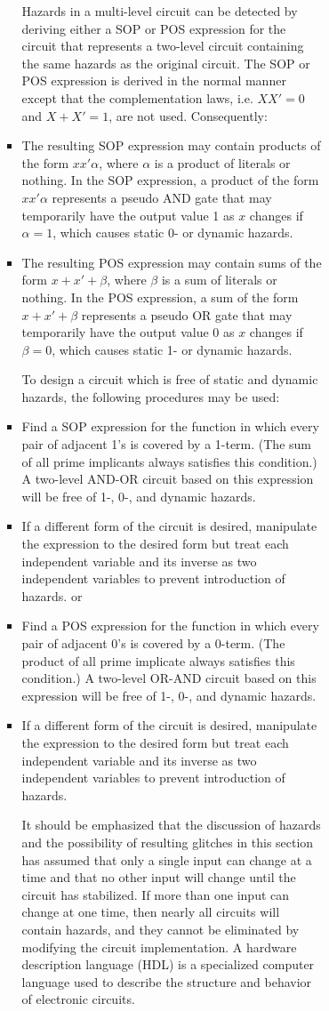 \documentclass[a4paper,12pt]{article}
\begin{document}
\begin{itemize}
\begin{itemize}
\begin{itemize}
\begin{itemize}
\begin{itemize}
\begin{itemize}
\begin{itemize}
Hazards in a multi-level circuit can be detected by deriving either a SOP or POS expression for the circuit that represents a two-level circuit containing the same hazards as the original circuit. The SOP or POS expression is derived in the normal manner except that the complementation laws, i.e. $XX'=0$ and $X+X'=1$, are not used. Consequently:
\bit
\item The resulting SOP expression may contain products of the form $xx'\alpha$, where $\alpha$ is a product of literals or nothing. In the SOP expression, a product of the form $xx'\alpha$ represents a pseudo AND gate that may temporarily have the output value 1 as $x$ changes if $\alpha=1$, which causes static 0- or dynamic hazards.
\item The resulting POS expression may contain sums of the form $x+x'+\beta$, where $\beta$ is a sum of literals or nothing. In the POS expression, a sum of the form $x+x'+\beta$ represents a pseudo OR gate that may temporarily have the output value 0 as $x$ changes if $\beta=0$, which causes static 1- or dynamic hazards.
\eit

To design a circuit  which is free of static and dynamic hazards, the following procedures may be used:
\ben
\item Find a SOP expression for the function in which every pair of adjacent 1's is covered by a 1-term. (The sum of all prime implicants always satisfies this condition.) A two-level AND-OR circuit based on this expression will be free of 1-, 0-, and dynamic hazards.
\item If a different form of the circuit is desired, manipulate the expression to the desired form but treat each independent variable and its inverse as two independent variables to prevent introduction of hazards.
\een
or
\ben
\item Find a POS expression for the function in which every pair of adjacent 0's is covered by a 0-term. (The product of all prime implicate always satisfies this condition.) A two-level OR-AND circuit based on this expression will be free of 1-, 0-, and dynamic hazards.
\item If a different form of the circuit is desired, manipulate the expression to the desired form but treat each independent variable and its inverse as two independent variables to prevent introduction of hazards.
\een

It should be emphasized that the discussion of hazards and the possibility of resulting glitches in this section has assumed that only a single input can change at a time and that no other input will change until the circuit has stabilized. If more than one input can change at one time, then nearly all circuits will contain hazards, and they cannot be eliminated by modifying the circuit implementation.
A hardware description language (HDL) is a specialized computer language used to describe the structure and behavior of electronic circuits.


\end{itemize}
\end{itemize}
\end{itemize}
\end{itemize}
\end{itemize}
\end{itemize}
\end{itemize}
\end{document}

